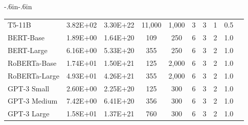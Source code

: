 \begin{table}[!h]
\begin{adjustwidth}{-.6in}{-.6in}
{\begin{center}
\begin{tabular}{lccccccccc}
                    T5-11B &                      3.82E+02 &                    3.30E+22 &     11,000 &                      1,000 &                               3 &                       3 &                                         1 &                                      0.5 &   \\
                 BERT-Base &                      1.89E+00 &                    1.64E+20 &        109 &                        250 &                               6 &                       3 &                                         2 &                                      1.0 &   \\
                BERT-Large &                      6.16E+00 &                    5.33E+20 &        355 &                        250 &                               6 &                       3 &                                         2 &                                      1.0 &   \\
              RoBERTa-Base &                      1.74E+01 &                    1.50E+21 &        125 &                      2,000 &                               6 &                       3 &                                         2 &                                      1.0 &   \\
             RoBERTa-Large &                      4.93E+01 &                    4.26E+21 &        355 &                      2,000 &                               6 &                       3 &                                         2 &                                      1.0 &   \\
               GPT-3 Small &                      2.60E+00 &                    2.25E+20 &        125 &                        300 &                               6 &                       3 &                                         2 &                                      1.0 &   \\
              GPT-3 Medium &                      7.42E+00 &                    6.41E+20 &        356 &                        300 &                               6 &                       3 &                                         2 &                                      1.0 &   \\
               GPT-3 Large &                      1.58E+01 &                    1.37E+21 &        760 &                        300 &                               6 &                       3 &                                         2 &                                      1.0 &   \\

\end{tabular}
\end{center}}
\end{adjustwidth}
\end{table}
